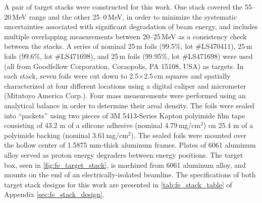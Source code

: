 A pair of target stacks were constructed for this work.
One stack covered the 55--20\,MeV range and the other  25--0\,MeV, in order to minimize the systematic uncertainties associated with significant degradation of beam energy, and
includes multiple overlapping measurements between 20--25\,MeV as a consistency check between the stacks.
A series of nominal 25\,\mmicro m  foils (99.5\%, lot \#LS470411), 25\,\mmicro m  foils (99.6\%, lot \#LS471698), and 25\,\mmicro m  foils (99.95\%, lot \#LS471698) were used (all from Goodfellow Corporation, Coraopolis, PA 15108, USA) as targets.
In each stack, seven foils 
were cut down to 2.5$\times$2.5\,cm squares and spatially characterized 
at four different locations using a digital caliper and micrometer (Mitutoyo America Corp.).
Four mass measurements were performed using an analytical balance 
in order to determine their areal density. 
The foils were  sealed into \enquote{packets} using two pieces of  3M 5413-Series Kapton polyimide film tape 
consisting of 43.2 \mmicro m of a silicone adhesive (nominal 4.79\,mg/cm$^2$) on 25.4 \mmicro m of a polyimide backing (nominal 3.61\,mg/cm$^2$).
The sealed foils were mounted over the hollow center of  1.5875 mm-thick aluminum frames.
Plates of 6061 aluminum alloy  served as proton energy degraders  between energy positions.
The target box, seen in \autoref{fig:fe_target_stack}, is machined from 6061 aluminum alloy, and mounts on the end of an electrically-isolated beamline.
The specifications of both target stack designs for this work are presented in \autoref{tab:fe_stack_table} of Appendix \ref{sec:fe_stack_design}.



